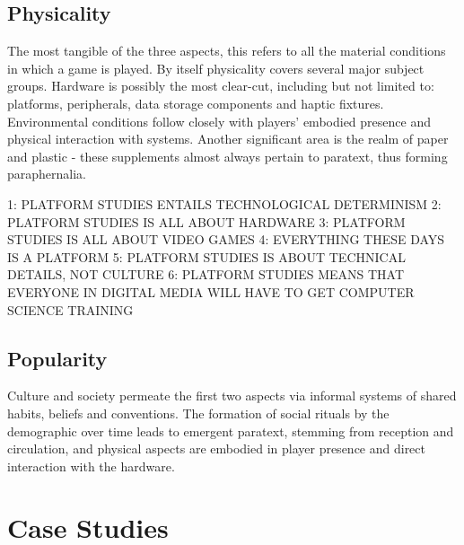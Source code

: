 \documentclass[12pt,oneside]{book}
\begin{document}
\section{Physicality}

The most tangible of the three aspects, this refers to all the material conditions in which a game is played.
By itself physicality covers several major subject groups.
Hardware is possibly the most clear-cut, including but not limited to: platforms, peripherals, data storage components and haptic fixtures.
Environmental conditions follow closely with players' embodied presence and physical interaction with systems.
Another significant area is the realm of paper and plastic - these supplements almost always pertain to paratext, thus forming paraphernalia.

\cite{bogost-platform}
1: PLATFORM STUDIES ENTAILS TECHNOLOGICAL DETERMINISM
2: PLATFORM STUDIES IS ALL ABOUT HARDWARE 
3: PLATFORM STUDIES IS ALL ABOUT VIDEO GAMES 
4: EVERYTHING THESE DAYS IS A PLATFORM
5: PLATFORM STUDIES IS ABOUT TECHNICAL DETAILS, NOT CULTURE
6: PLATFORM STUDIES MEANS THAT EVERYONE IN DIGITAL MEDIA WILL HAVE TO GET COMPUTER SCIENCE TRAINING 
\section{Popularity}
Culture and society permeate the first two aspects via informal systems of shared habits, beliefs and conventions.
The formation of social rituals by the demographic over time leads to emergent paratext, stemming from reception and circulation, and physical aspects are embodied in player presence and direct interaction with the hardware.

\chapter{Case Studies}
\end{document}

